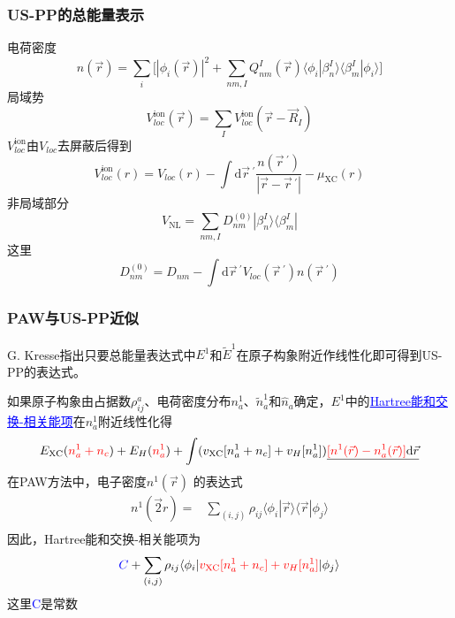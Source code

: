 \documentclass[cjk,slidestop,compress,mathserif,blue]{beamer}
\begin{document}
\frame
{
	\frametitle{\textrm{US-PP}的总能量表示}
	电荷密度$$n(\vec r)=\sum_i\big[|\phi_i(\vec r)|^2+\sum_{nm,I}Q_{nm}^I(\vec r)\langle\phi_i|\beta_n^I\rangle\langle\beta_m^I|\phi_i\rangle\big]$$
	局域势$$V_{loc}^{\mathrm{ion}}(\vec r)=\sum_IV_{loc}^{\mathrm{ion}}(\vec r-\vec R_I)$$
	$V_{loc}^{\mathrm{ion}}$由$V_{loc}$去屏蔽后得到$$V_{loc}^{\mathrm{ion}}(r)=V_{loc}(r)-\int\mathrm{d}\vec r\,^{\prime}\dfrac{n(\vec r\,^{\prime})}{|\vec r-\vec r\,^{\prime}|}-\mu_{\mathrm{XC}}(r)$$
	非局域部分$$V_{\mathrm{NL}}=\sum_{nm,I}D_{nm}^{(0)}|\beta_n^I\rangle\langle\beta_m^I|$$
	这里$$D_{nm}^{(0)}=D_{nm}-\int\mathrm{d}\vec r\,^{\prime}V_{loc}(\vec r\,^{\prime})n(\vec r\,^{\prime})$$
}

\frame
{
	\frametitle{\textrm{PAW}与\textrm{US-PP}近似}
	\textrm{G. Kresse}指出只要总能量表达式中$E^1$和$\tilde E^1$在原子构象附近作线性化即可得到\textrm{US-PP}的表达式。
	
	如果原子构象由占据数$\rho_{ij}^a$、电荷密度分布$n_a^1$、$\tilde n_a^1$和$\hat n_a$确定，$E^1$中的\textcolor{blue}{\underline{\textrm{Hartree}能和交换-相关能项}}在$n_a^1$附近线性化得
	\begin{displaymath}
		E_{\mathrm{XC}}(\textcolor{red}{n_a^1+n_c})+E_H(\textcolor{red}{n_a^1})+\int(v_{\mathrm{XC}}[n_a^1+n_c]+v_H[n_a^1])\underline{\textcolor{red}{[n^1(\vec r)-n_a^1(\vec r)]}\mathrm{d}\vec r}
	\end{displaymath}
	在\textrm{PAW}方法中，电子密度$n^1(\vec r)$%
	的表达式
	\begin{displaymath}
		\begin{aligned}
			n^1(\vec2 r)=&\sum_{(i,j)}\rho_{ij}\langle\phi_i|\vec r\rangle\langle\vec r|\phi_j\rangle\\
		\end{aligned}
	\end{displaymath}
	因此，\textrm{Hartree}能和交换-相关能项为
	$$\textcolor{blue}{C}+\sum_{(i,j)}\rho_{ij}\langle\phi_i|\textcolor{red}{v_{\mathrm{XC}}[n_a^1+n_c]+v_H[n_a^1]}|\phi_j\rangle$$
	这里\textcolor{blue}{\textrm{C}}是常数
}
\end{document}
